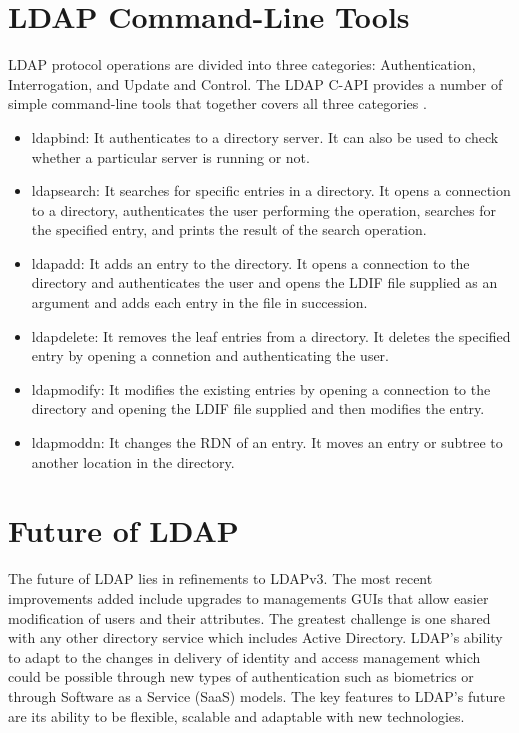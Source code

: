 \documentclass[9pt,twocolumn,twoside]{styles/osajnl}
\begin{document}
\section{LDAP Command-Line Tools}
LDAP protocol operations are divided into three categories:
Authentication, Interrogation, and Update and Control.  The LDAP C-API
provides a number of simple command-line tools that together covers
all three categories \cite{www-ldap-commands}.
\begin{itemize}
\item ldapbind: It authenticates to a directory server. It can also be
  used to check whether a particular server is running or not.
\item ldapsearch: It searches for specific entries in a directory. It
  opens a connection to a directory, authenticates the user performing
  the operation, searches for the specified entry, and prints the
  result of the search operation.
\item ldapadd: It adds an entry to the directory. It opens a
  connection to the directory and authenticates the user and opens the
  LDIF file supplied as an argument and adds each entry in the file in
  succession.
\item ldapdelete: It removes the leaf entries from a directory. It
  deletes the specified entry by opening a connetion and
  authenticating the user.
\item ldapmodify: It modifies the existing entries by opening a
  connection to the directory and opening the LDIF file supplied and
  then modifies the entry.
\item ldapmoddn: It changes the RDN of an entry. It moves an entry or
  subtree to another location in the directory.
\end{itemize}

\section{Future of LDAP}
The future of LDAP lies in refinements to LDAPv3. The most recent
improvements added include upgrades to managements GUIs that allow
easier modification of users and their attributes. The greatest
challenge is one shared with any other directory service which
includes Active Directory. LDAP's ability to adapt to the changes in
delivery of identity and access management which could be possible
through new types of authentication such as biometrics or through
Software as a Service (SaaS) models. The key features to LDAP's future
are its ability to be flexible, scalable and adaptable with new
technologies. \cite{ldap-ibm-book}
\end{document}
